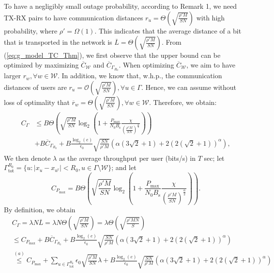 \documentclass[journal,draftclsnofoot,onecolumn,12pt,twoside]{IEEEtran}
\begin{document}
To have a negligibly small outage probability, according to Remark 1, we need TX-RX pairs to have communication distances $r_u=\Theta\left(\sqrt{\frac{\rho'M}{SN}}\right)$ with high probability, where $\rho'=\Omega(1)$. This indicates that the average distance of a bit that is transported in the network is $\overline{L}=\Theta\left(\sqrt{\frac{\rho'M}{SN}}\right)$. From (\ref{eq:g_model_TC_Thm}), we first observe that the upper bound can be optimized by maximizing $\overline{C}_{\mathcal{W}}$ and $\overline{C}_{\Gamma_{R_0}}$. When optimizing $\overline{C}_{\mathcal{W}}$, we aim to have larger $r_w,\forall w\in \mathcal{W}$. In addition, we know that, w.h.p., the communication
distances of users are $r_u=\mathcal{O}\left(\sqrt{\frac{\rho'M}{SN}}\right),\forall u\in\Gamma$. Hence, we can assume without loss of optimality that $\overline{r}_{w}=\Theta\left(\sqrt{\frac{\rho'M}{SN}}\right),\forall w\in \mathcal{W}$. Therefore, we obtain:
\begin{equation}
\begin{aligned}\label{eq:g_model_TC_Anal_1}
C_{\Gamma}&\leq B\Theta\left(\sqrt{\frac{\rho'M}{SN}}\log_2\left(1+\frac{P_{\text{max}}}{N_0B_{\text{s}}}\frac{\chi}{\left(\frac{\rho'M}{SN}\right)^\frac{\alpha}{2}}\right)\right)\\
&+B\overline{C}_{\Gamma_{R_0}}+B\frac{\log_2(e)}{\epsilon_0}\sqrt{\frac{SN}{\rho'M}}\left(\alpha\left(3\sqrt{2}+1\right)+2(2(\sqrt{2}+1))^{\alpha}\right),
\end{aligned}
\end{equation} 
We then denote $\lambda$ as the average throughput per user (bits/s) in $T$ sec; let $\Gamma^{R_0}_{\text{tot}}=\lbrace u: \vert x_u-x_{u^{\text{r}}}\vert<R_0,u\in\Gamma\setminus \mathcal{W} \rbrace$; and let 
\begin{equation}
C_{P_{\text{max}}}= B\Theta\left(\sqrt{\frac{\rho'M}{SN}}\log_2\left(1+\frac{P_{\text{max}}}{N_0B_{\text{s}}}\frac{\chi}{\left(\frac{\rho'M}{SN}\right)^\frac{\alpha}{2}}\right)\right).
\end{equation}
By definition, we obtain
\begin{equation}
\begin{aligned}
&C_{\Gamma}=\lambda N \overline{L}=\lambda N\Theta\left(\sqrt{\frac{\rho'M}{SN}}\right)=\lambda\Theta\left(\sqrt{\frac{\rho'MN}{S}}\right)\\
&\leq C_{P_{\text{max}}}+ B\overline{C}_{\Gamma_{R_0}}+B\frac{\log_2(e)}{\epsilon_0}\sqrt{\frac{SN}{\rho'M}}\left(\alpha\left(3\sqrt{2}+1\right)+2(2(\sqrt{2}+1))^{\alpha}\right)\\
&\stackrel{(a)}{\leq} C_{P_{\text{max}}}+ \sum_{u\in\Gamma^{R_0}_{\text{tot}}}\epsilon_0\sqrt{\frac{\rho'M}{SN}}\lambda+B\frac{\log_2(e)}{\epsilon_0}\sqrt{\frac{SN}{\rho'M}}\left(\alpha\left(3\sqrt{2}+1\right)+2(2(\sqrt{2}+1))^{\alpha}\right)
\end{aligned}
\end{equation}
\end{document}
